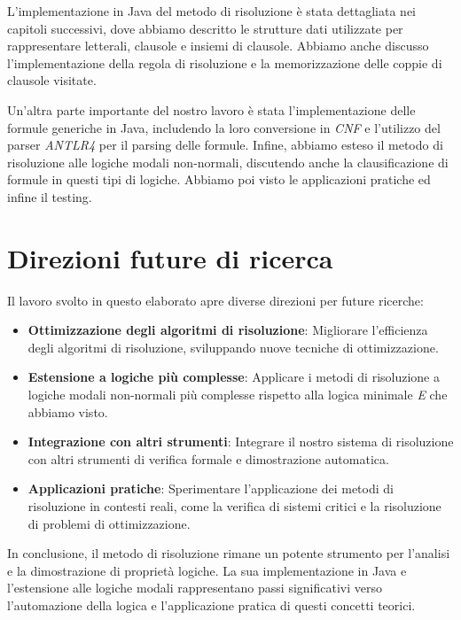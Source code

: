 \documentclass[a4paper,12pt]{report}
\begin{document}
L'implementazione in Java del metodo di risoluzione è stata dettagliata nei capitoli successivi, dove abbiamo descritto le strutture dati utilizzate per rappresentare letterali, clausole e insiemi di clausole. Abbiamo anche discusso l'implementazione della regola di risoluzione e la memorizzazione delle coppie di clausole visitate.

Un'altra parte importante del nostro lavoro è stata l'implementazione delle formule generiche in Java, includendo la loro conversione in \emph{CNF} e l'utilizzo del parser \emph{ANTLR4} per il parsing delle formule. Infine, abbiamo esteso il metodo di risoluzione alle logiche modali non-normali, discutendo anche la clausificazione di formule in questi tipi di logiche. Abbiamo poi visto le applicazioni pratiche ed infine il testing. 

\newpage

\section{Direzioni future di ricerca}
Il lavoro svolto in questo elaborato apre diverse direzioni per future ricerche:

\begin{itemize}
    \item \textbf{Ottimizzazione degli algoritmi di risoluzione}: Migliorare l'efficienza degli algoritmi di risoluzione, sviluppando nuove tecniche di ottimizzazione.
    \item \textbf{Estensione a logiche più complesse}: Applicare i metodi di risoluzione a logiche modali non-normali più complesse rispetto alla logica minimale \emph{E} che abbiamo visto.
    \item \textbf{Integrazione con altri strumenti}: Integrare il nostro sistema di risoluzione con altri strumenti di verifica formale e dimostrazione automatica.
    \item \textbf{Applicazioni pratiche}: Sperimentare l'applicazione dei metodi di risoluzione in contesti reali, come la verifica di sistemi critici e la risoluzione di problemi di ottimizzazione.
\end{itemize}
In conclusione, il metodo di risoluzione rimane un potente strumento per l'analisi e la dimostrazione di proprietà logiche. La sua implementazione in Java e l'estensione alle logiche modali rappresentano passi significativi verso l'automazione della logica e l'applicazione pratica di questi concetti teorici.


%
%


\end{document}
